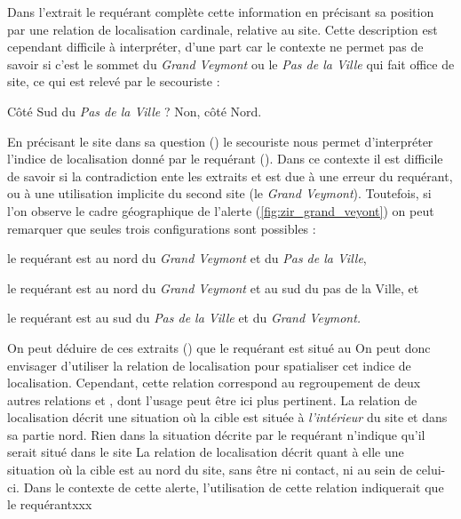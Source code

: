 %
Dans l'extrait  le requérant complète cette information en
précisant sa position par une relation de localisation cardinale,
relative au site.
%
Cette description est cependant difficile à interpréter, d'une part
car le contexte ne permet pas de savoir si c'est le sommet du
\emph{Grand Veymont} ou le \emph{Pas de la Ville} qui fait office de
site, ce qui est relevé par le secouriste :
%
\begin{dialogue}
  \Sec {} Côté Sud du \emph{Pas de la Ville} ?
%
  \Req {} Non, côté Nord.
\end{dialogue}
%
En précisant le site dans sa question () le secouriste nous
permet d'interpréter l'indice de localisation donné par le requérant
().
%
Dans ce contexte il est difficile de savoir si la contradiction ente
les extraits  et  est due à une erreur du requérant,
ou à une utilisation implicite du second site (le \emph{Grand
  Veymont}). Toutefois, si l'on observe le cadre géographique de
l'alerte (\autoref{fig:zir_grand_veyont}) on peut remarquer que seules
trois configurations sont possibles :
%
\begin{enumerate*}[label=(\arabic*)]
\item le requérant est au nord du \emph{Grand Veymont} et du \emph{Pas
    de la Ville},
\item le requérant est au nord du \emph{Grand Veymont} et au sud du
  pas de la Ville, et
\item le requérant est au sud du \emph{Pas de la Ville} et du
  \emph{Grand Veymont.}
\end{enumerate*}
%

On peut déduire de ces extraits () que le requérant
est situé au
%
On peut donc envisager d'utiliser la relation de localisation
 pour spatialiser cet indice de
localisation. Cependant, cette relation correspond au regroupement de
deux autres relations  et
, dont l'usage peut être ici plus
pertinent.
%
La relation de localisation 
décrit une situation où la cible est située à \emph{l'intérieur} du
site et dans sa partie nord.
%
Rien dans la situation décrite par le requérant n'indique qu'il serait
situé dans le site
%
La relation de localisation  décrit
quant à elle une situation où la cible est au nord du site, sans être
ni contact, ni au sein de celui-ci.
%
Dans le contexte de cette alerte, l'utilisation de cette relation
indiquerait que le requérantxxx





